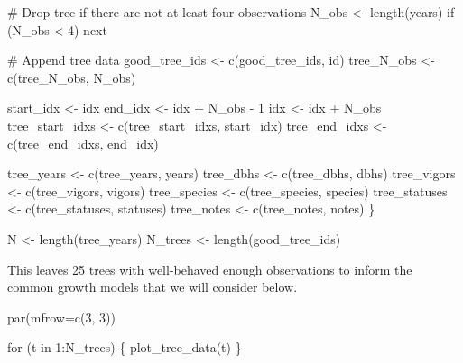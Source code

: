 \documentclass[
  letterpaper,
  DIV=11,
  numbers=noendperiod]{scrartcl}
\newenvironment{Shaded}{\begin{snugshade}}{\end{snugshade}}
\newcommand{\AttributeTok}[1]{\textcolor[rgb]{0.40,0.45,0.13}{#1}}
\newcommand{\CommentTok}[1]{\textcolor[rgb]{0.37,0.37,0.37}{#1}}
\newcommand{\ControlFlowTok}[1]{\textcolor[rgb]{0.00,0.23,0.31}{#1}}
\newcommand{\DecValTok}[1]{\textcolor[rgb]{0.68,0.00,0.00}{#1}}
\newcommand{\FunctionTok}[1]{\textcolor[rgb]{0.28,0.35,0.67}{#1}}
\newcommand{\NormalTok}[1]{\textcolor[rgb]{0.00,0.23,0.31}{#1}}
\newcommand{\OtherTok}[1]{\textcolor[rgb]{0.00,0.23,0.31}{#1}}
\newcommand{\SpecialCharTok}[1]{\textcolor[rgb]{0.37,0.37,0.37}{#1}}
\begin{document}
\begin{Shaded}
\begin{Highlighting}[]
  \CommentTok{\# Drop tree if there are not at least four observations}
\NormalTok{  N\_obs }\OtherTok{\textless{}{-}} \FunctionTok{length}\NormalTok{(years)}
  \ControlFlowTok{if}\NormalTok{ (N\_obs }\SpecialCharTok{\textless{}} \DecValTok{4}\NormalTok{) }\ControlFlowTok{next}

  \CommentTok{\# Append tree data}
\NormalTok{  good\_tree\_ids }\OtherTok{\textless{}{-}} \FunctionTok{c}\NormalTok{(good\_tree\_ids, id)}
\NormalTok{  tree\_N\_obs }\OtherTok{\textless{}{-}} \FunctionTok{c}\NormalTok{(tree\_N\_obs, N\_obs)}

\NormalTok{  start\_idx }\OtherTok{\textless{}{-}}\NormalTok{ idx}
\NormalTok{  end\_idx }\OtherTok{\textless{}{-}}\NormalTok{ idx }\SpecialCharTok{+}\NormalTok{ N\_obs }\SpecialCharTok{{-}} \DecValTok{1}
\NormalTok{  idx }\OtherTok{\textless{}{-}}\NormalTok{ idx }\SpecialCharTok{+}\NormalTok{ N\_obs}
\NormalTok{  tree\_start\_idxs }\OtherTok{\textless{}{-}} \FunctionTok{c}\NormalTok{(tree\_start\_idxs, start\_idx)}
\NormalTok{  tree\_end\_idxs }\OtherTok{\textless{}{-}} \FunctionTok{c}\NormalTok{(tree\_end\_idxs, end\_idx)}

\NormalTok{  tree\_years }\OtherTok{\textless{}{-}} \FunctionTok{c}\NormalTok{(tree\_years, years)}
\NormalTok{  tree\_dbhs }\OtherTok{\textless{}{-}} \FunctionTok{c}\NormalTok{(tree\_dbhs, dbhs)}
\NormalTok{  tree\_vigors }\OtherTok{\textless{}{-}} \FunctionTok{c}\NormalTok{(tree\_vigors, vigors)}
\NormalTok{  tree\_species }\OtherTok{\textless{}{-}} \FunctionTok{c}\NormalTok{(tree\_species, species)}
\NormalTok{  tree\_statuses }\OtherTok{\textless{}{-}} \FunctionTok{c}\NormalTok{(tree\_statuses, statuses)}
\NormalTok{  tree\_notes }\OtherTok{\textless{}{-}} \FunctionTok{c}\NormalTok{(tree\_notes, notes)}
\NormalTok{\}}

\NormalTok{N }\OtherTok{\textless{}{-}} \FunctionTok{length}\NormalTok{(tree\_years)}
\NormalTok{N\_trees }\OtherTok{\textless{}{-}} \FunctionTok{length}\NormalTok{(good\_tree\_ids)}
\end{Highlighting}
\end{Shaded}

This leaves 25 trees with well-behaved enough observations to inform the
common growth models that we will consider below.

\begin{Shaded}
\begin{Highlighting}[]
\FunctionTok{par}\NormalTok{(}\AttributeTok{mfrow=}\FunctionTok{c}\NormalTok{(}\DecValTok{3}\NormalTok{, }\DecValTok{3}\NormalTok{))}

\ControlFlowTok{for}\NormalTok{ (t }\ControlFlowTok{in} \DecValTok{1}\SpecialCharTok{:}\NormalTok{N\_trees) \{}
  \FunctionTok{plot\_tree\_data}\NormalTok{(t)}
\NormalTok{\}}
\end{Highlighting}
\end{Shaded}
\end{document}
